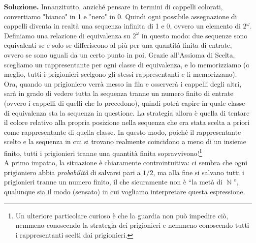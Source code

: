 \documentclass[12pt,a4paper]{report}
\theoremstyle{definition}
\theoremstyle{num.custom-title}
\DeclareMathOperator{\N}{\mathbb{N}}
\begin{document}
\noindent\textbf{Soluzione.} Innanzitutto, anziché pensare in termini di cappelli colorati, convertiamo "bianco" in 1 e "nero" in 0. Quindi ogni possibile assegnazione di cappelli diventa in realtà una sequenza infinita di 1 e 0, ovvero un elemento di $2^\omega$. Definiamo una relazione di equivalenza su $2^\omega$ in questo modo: due sequenze sono equivalenti se e solo se differiscono al più per una quantità finita di entrate, ovvero se sono uguali da un certo punto in poi. Grazie all'Assioma di Scelta, scegliamo un rappresentante per ogni classe di equivalenza, e lo memorizziamo (o meglio, tutti i prigionieri scelgono gli stessi rappresentanti e li memorizzano). Ora, quando un prigioniero verrà messo in fila e osserverà i cappelli degli altri, sarà in grado di vedere tutta la sequenza tranne un numero finito di entrate (ovvero i cappelli di quelli che lo precedono), quindi potrà capire in quale classe di equivalenza sta la sequenza in questione. La strategia allora è quella di tentare il colore relativo alla propria posizione nella sequenza che era stata scelta a priori come rappresentante di quella classe. In questo modo, poiché il rappresentante scelto e la sequenza in cui si trovano realmente coincidono a meno di un insieme finito, tutti i prigionieri tranne una quantità finita sopravvivono!\footnote{Un ulteriore particolare curioso è che la guardia non può impedire ciò, nemmeno conoscendo la strategia dei prigionieri e nemmeno conoscendo tutti i rappresentanti scelti dai prigionieri.}\\

A primo impatto, la situazione è chiaramente controintuitiva: ci sembra che ogni prigioniero abbia \emph{probabilità} di salvarsi pari a $1/2$, ma alla fine si salvano tutti i prigionieri tranne un numero finito, il che sicuramente non è ``la metà di $\N$'', qualunque sia il modo (sensato) in cui vogliamo interpretare questa espressione.
\end{document}
